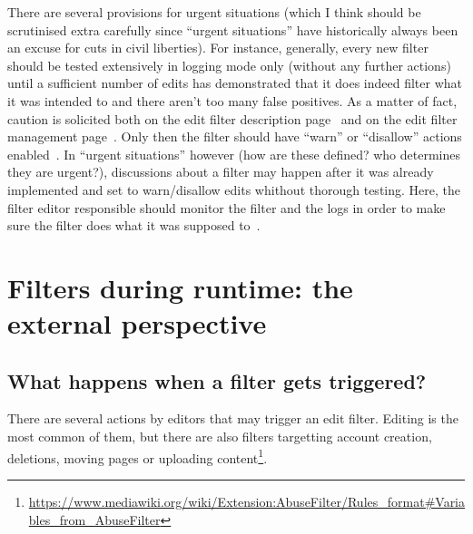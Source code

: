 There are several provisions for urgent situations (which I think should be scrutinised extra carefully since ``urgent situations'' have historically always been an excuse for cuts in civil liberties).
For instance, generally, every new filter should be tested extensively in logging mode only (without any further actions) until a sufficient number of edits has demonstrated that it does indeed filter what it was intended to and there aren't too many false positives.
As a matter of fact, caution is solicited both on the edit filter description page~\cite{Wikipedia:EditFilter} and on the edit filter management page~\cite{Wikipedia:EditFilterManagement}.
Only then the filter should have ``warn'' or ``disallow'' actions enabled~\cite{Wikipedia:EditFilter}.
In ``urgent situations'' however (how are these defined? who determines they are urgent?), discussions about a filter may happen after it was already implemented and set to warn/disallow edits whithout thorough testing.
Here, the filter editor responsible should monitor the filter and the logs in order to make sure the filter does what it was supposed to~\cite{Wikipedia:EditFilter}.

\section{Filters during runtime: the external perspective}
\subsection{What happens when a filter gets triggered?}

There are several actions by editors that may trigger an edit filter.
Editing is the most common of them, but there are also filters targetting account creation, deletions, moving pages or uploading content\footnote{\url{https://www.mediawiki.org/wiki/Extension:AbuseFilter/Rules_format\#Variables_from_AbuseFilter}}.

